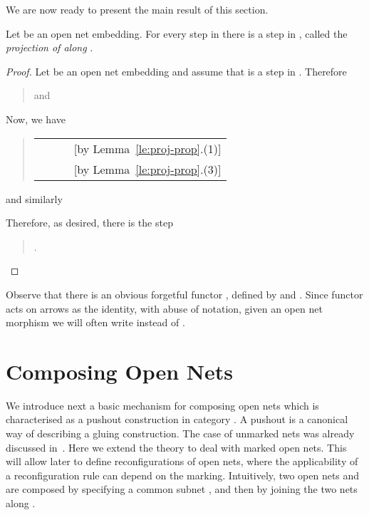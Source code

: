 \documentclass{LMCS}
\begin{document}
We are now ready to present the main result of this section.

\begin{lem}
  \label{le:reflect}
  Let  be an open net embedding.  For every step  in  there is a step  in , called the \emph{projection of  along }.
\end{lem}

\begin{proof}
  Let  be an open net embedding and assume that  is a step in . Therefore
  \begin{quote}
     \quad and \quad 
  \end{quote}
Now, we have
  \begin{quote}
    \begin{tabular}{lll}
       \\
      \ \quad  & \ \quad &  [by Lemma~\ref{le:proj-prop}.(1)]\\
\ \quad  & &
      [by Lemma~\ref{le:proj-prop}.(3)]
    \end{tabular}
  \end{quote}
  and similarly
    \begin{quote}
      
    \end{quote}
Therefore, as desired, there is the step
    \begin{quote}
      .
    \end{quote}
\end{proof}


Observe that there is an obvious forgetful functor , defined by  and . Since functor  acts on arrows as the identity,
with abuse of notation, given an open net morphism 
we will often write  instead of .



\section{Composing Open Nets}
\label{se:composing-nets}

We introduce next a basic mechanism for composing open nets which is
characterised as a pushout construction in category . A pushout
is a canonical way of describing a gluing construction.
The case of unmarked nets was already discussed in~\cite{BCEH:CSOP}. Here we
extend the theory to deal with marked open nets. 
This will allow later to define reconfigurations of open nets, where
the applicability of a reconfiguration rule can depend on the marking.
Intuitively, two open nets  and  are composed by specifying a
common subnet , and then by joining the two nets along .
\end{document}
